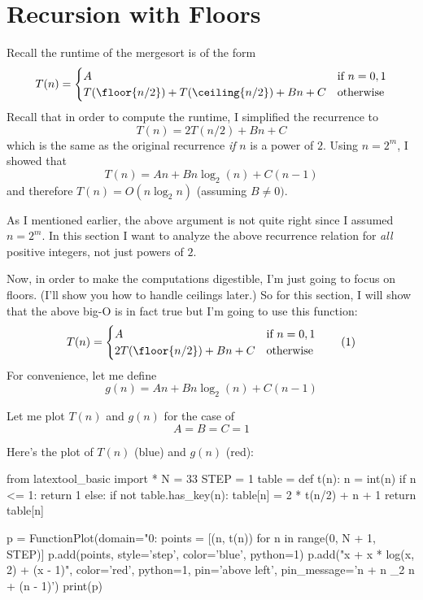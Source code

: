 \section{Recursion with Floors}

Recall the runtime of the mergesort is of the form
\[
T(n) 
= 
\begin{cases}
A                        & \text{if $n = 0, 1$} \\
T(\floor{n/2}) + T(\ceiling{n/2}) + Bn + C & \text{otherwise}
\end{cases}
\]
Recall that in order to compute the runtime, I simplified the recurrence
to
\[
T(n) = 2T(n/2) + Bn + C
\]
which is the same as the original recurrence \textit{if} $n$ is a power of $2$.
Using $n = 2^m$, I showed that 
\[
T(n) = An + Bn \log_2(n) + C(n-1)
\]
and therefore $T(n) = O(n\log_2 n)$ (assuming $B \neq 0)$.

As I mentioned earlier, the above argument is not quite right
since I assumed $n = 2^m$.
In this section I want to analyze the above recurrence
relation for \textit{all} positive integers, not just powers of $2$.

Now, in order to make the computations digestible, 
I'm just going to focus on floors.
(I'll show you how to handle ceilings later.)
So for this section, I will show that the above big-O is in fact true but
I'm going to use this function:
\[
T(n) 
= 
\begin{cases}
A                        & \text{if $n = 0, 1$} \\
2T(\floor{n/2}) + Bn + C & \text{otherwise}
\end{cases}
\tag{1}
\]
For convenience, let me define
\[
g(n) = An + Bn\log_2(n) + C(n - 1)
\]

Let me plot $T(n)$ and $g(n)$ for the case of
\[
A = B = C = 1
\]

Here's the plot of $T(n)$ (blue) and $g(n)$ (red):
\begin{python}
from latextool_basic import *
N = 33
STEP = 1
table = {}
def t(n):
    n = int(n)
    if n <= 1: return 1
    else:
        if not table.has_key(n):
            table[n] = 2 * t(n/2) + n + 1
        return table[n]

p = FunctionPlot(domain="0:%
points = [(n, t(n)) for n in range(0, N + 1, STEP)]
p.add(points, style='step', color='blue', python=1)
p.add("x + x * log(x, 2) + (x - 1)", color='red', python=1, pin='above left',
pin_message='n + n \log_2 n + (n - 1)')
print(p)
\end{python}

